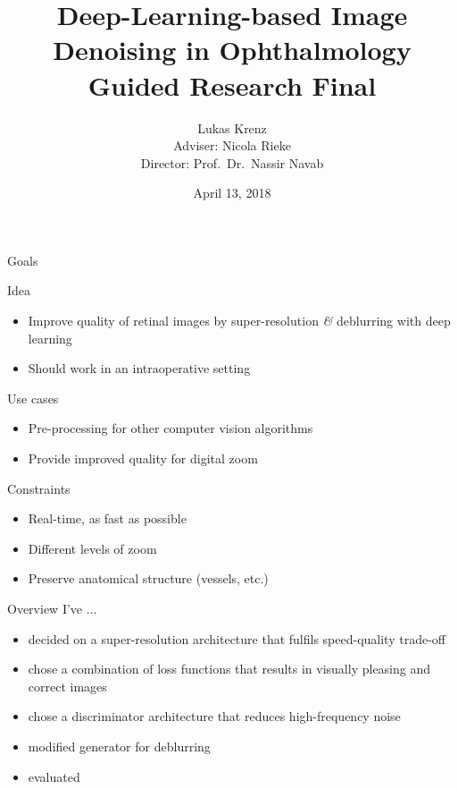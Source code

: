 \documentclass{beamer}
\title{Deep-Learning-based Image Denoising in Ophthalmology\\Guided Research Final}
\author{Lukas Krenz\\Adviser: Nicola Rieke\\Director: Prof.\ Dr.\ Nassir Navab}
\date{April 13, 2018}
\institute{TUM, Chair for Computer Aided Medical Procedures \textit{\&} Augmented Reality}
\begin{document}
\maketitle

\begin{frame}{Goals}
\begin{block}{Idea}
\begin{itemize}
\item Improve quality of retinal images by super-resolution \textit{\&} deblurring with deep learning
\item Should work in an intraoperative setting
\end{itemize}
\end{block}

\begin{block}{Use cases}
\begin{itemize}
\item Pre-processing for other computer vision algorithms
\item Provide improved quality for digital zoom
\end{itemize}
\end{block}

\begin{block}{Constraints}
  \begin{itemize}
  \item Real-time, as fast as possible
  \item Different levels of zoom
  \item Preserve anatomical structure (vessels, etc.)
  \end{itemize}
\end{block}
\end{frame}

\begin{frame}{Overview}
  I've $\dots$
  \begin{itemize}
  \item decided on a super-resolution architecture that fulfils speed-quality trade-off
  \item chose a combination of loss functions that results in visually pleasing and correct images
  \item chose a discriminator architecture that reduces high-frequency noise
  \item modified generator for deblurring
  \item evaluated
  \end{itemize}
\end{frame}
\end{document}
